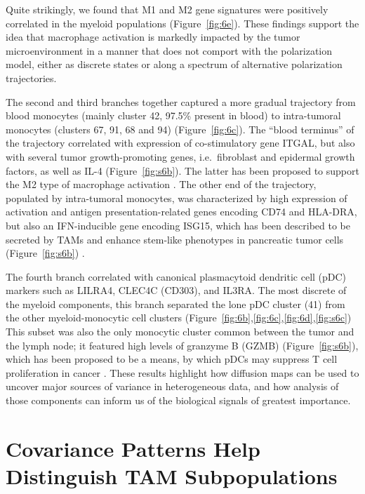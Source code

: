 Quite strikingly, we found that M1 and M2 gene signatures were positively correlated in the myeloid populations (Figure~\ref{fig:6e}).
These findings support the idea that macrophage activation is markedly impacted by the tumor microenvironment in a manner that does not comport with the polarization model, either as discrete states or along a spectrum of alternative polarization trajectories.

The second and third branches together captured a more gradual trajectory from blood monocytes (mainly cluster 42, 97.5\% present in blood) to intra-tumoral monocytes (clusters 67, 91, 68 and 94) (Figure~\ref{fig:6c}).
The ``blood terminus'' of the trajectory correlated with expression of co-stimulatory gene ITGAL, but also with several tumor growth-promoting genes, i.e.\ fibroblast and epidermal growth factors, as well as IL-4 (Figure~\ref{fig:s6b}).
The latter has been proposed to support the M2 type of macrophage activation \citep{Mantovani2013,Mills2000,Murray2014}.
The other end of the trajectory, populated by intra-tumoral monocytes, was characterized by high expression of activation and antigen presentation-related genes encoding CD74 and HLA-DRA, but also an IFN-inducible gene encoding ISG15, which has been described to be secreted by TAMs and enhance stem-like phenotypes in pancreatic tumor cells (Figure~\ref{fig:s6b}) \citep{Sainz2014}.

The fourth branch correlated with canonical plasmacytoid dendritic cell (pDC) markers such as LILRA4, CLEC4C (CD303), and IL3RA\@.
The most discrete of the myeloid components, this branch separated the lone pDC cluster (41) from the other myeloid-monocytic cell clusters (Figure~\ref{fig:6b},\ref{fig:6c},\ref{fig:6d},\ref{fig:s6c}) This subset was also the only monocytic cluster common between the tumor and the lymph node; it featured high levels of granzyme B (GZMB) (Figure~\ref{fig:s6b}), which has been proposed to be a means, by which pDCs may suppress T cell proliferation in cancer \citep{Jahrsdoerfer2010,Swiecki2015}.
These results highlight how diffusion maps can be used to uncover major sources of variance in heterogeneous data, and how analysis of those components can inform us of the biological signals of greatest importance. 

\section{Covariance Patterns Help Distinguish TAM Subpopulations}

